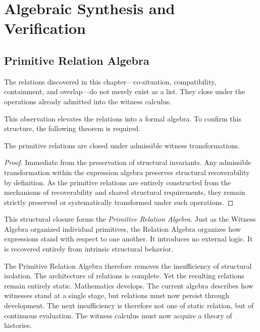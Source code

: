 \documentclass[12pt,anyside]{book}
\begin{document}
\section{Algebraic Synthesis and Verification}

\subsection{Primitive Relation Algebra}
The relations discovered in this chapter---co-situation, compatibility, containment, and overlap---do not merely exist as a list. They close under the operations already admitted into the witness calculus. 

This observation elevates the relations into a formal algebra. To confirm this structure, the following theorem is required.

\begin{theorem}
The primitive relations are closed under admissible witness transformations.
\end{theorem}
\begin{proof}
Immediate from the preservation of structural invariants. Any admissible transformation within the expression algebra preserves structural recoverability by definition. As the primitive relations are entirely constructed from the mechanisms of recoverability and shared structural requirements, they remain strictly preserved or systematically transformed under such operations.
\end{proof}

This structural closure forms the \textit{Primitive Relation Algebra}. Just as the Witness Algebra organized individual primitives, the Relation Algebra organizes how expressions stand with respect to one another. It introduces no external logic. It is recovered entirely from intrinsic structural behavior. 

The Primitive Relation Algebra therefore removes the insufficiency of structural isolation. The architecture of relations is complete. Yet the resulting relations remain entirely static. Mathematics develops. The current algebra describes how witnesses stand at a single stage, but relations must now persist through development. The next insufficiency is therefore not one of static relation, but of continuous evaluation. The witness calculus must now acquire a theory of histories.
\end{document}
